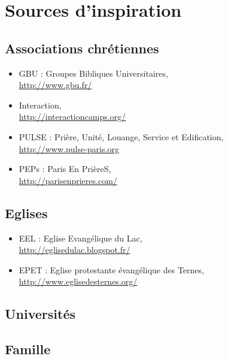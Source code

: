 \section{Sources d'inspiration}

	\subsection{Associations chrétiennes}
	
	\begin{itemize}
	\item GBU : Groupes Bibliques Universitaires,\\
		\url{http://www.gbu.fr/}
	\item Interaction,\\
		\url{http://interactioncamps.org/}
	\item PULSE : Prière, Unité, Louange, Service et Edification,\\
		\url{http://www.pulse-paris.org}
	\item PEPs : Paris En PrièreS,\\
		\url{http://parisenprieres.com/}
	\end{itemize}
	
	\subsection{Eglises}
	
	\begin{itemize}
	\item EEL : Eglise Evangélique du Lac,\\
		\url{http://eglisedulac.blogspot.fr/}
	\item EPET : Eglise protestante évangélique des Ternes,\\
		\url{http://www.eglisedesternes.org/} %
	\end{itemize}
	
	\subsection{Universités}
	
	
	\subsection{Famille}
	
